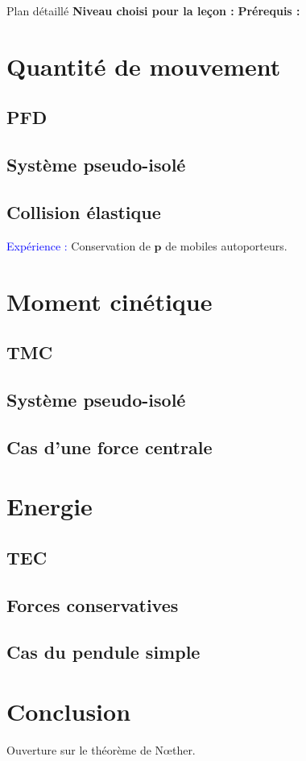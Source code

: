 \begin{reportBlock}{Plan détaillé}
  \textbf{Niveau choisi pour la leçon :} 
  \newline
  \textbf{Prérequis : }
  \newline


\section{Quantité de mouvement}

\subsection{PFD}
\subsection{Système pseudo-isolé}
\subsection{Collision élastique}
\textcolor{blue}{Expérience : }Conservation de $\mathbf{p}$ de mobiles autoporteurs.

\section{Moment cinétique}

\subsection{TMC}
\subsection{Système pseudo-isolé}
\subsection{Cas d'une force centrale}

\section{Energie}

\subsection{TEC}
\subsection{Forces conservatives}
\subsection{Cas du pendule simple}

\section*{Conclusion}
Ouverture sur le théorème de N\oe ther.

\end{reportBlock}